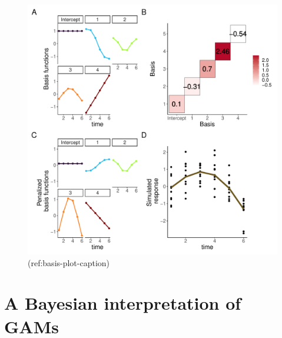 \documentclass[Royal,times,sagev]{sagej}
\begin{document}
\begin{figure}

{\centering \includegraphics[width=0.75\linewidth]{Full_document_SAGE_files/figure-latex/basis-plot-1} 

}

\caption{(ref:basis-plot-caption)}\label{fig:basis-plot}
\end{figure}

\hypertarget{a-bayesian-interpretation-of-gams}{%
\section{A Bayesian interpretation of
GAMs}\label{a-bayesian-interpretation-of-gams}}
\end{document}

